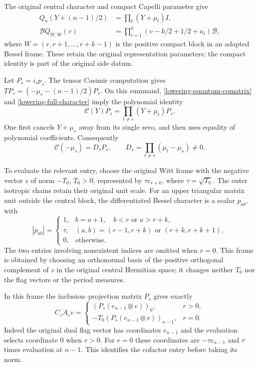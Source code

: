 The original central character and compact Capelli parameter give
\begin{align}
 Q_n(Y+(n-1)/2)&=\prod_t(Y+\mu_t)I,                  \label{lowering-full-character}\\
 \mathcal B Q_{W,W}(v)
   &=\prod_{i=1}^k(v-k/2+1/2+u_i)\mathcal B,        \label{lowering-compact-character}
\end{align}
where $W=(r,r+1,\ldots,r+k-1)$ is the positive compact block in an
adapted Bessel frame.  These retain the original representation
parameters; the compact identity is part of the original side datum.

Let $P_s=i_sp_s$.  The tensor Casimir computation gives
$TP_s=(-\mu_s-(n-1)/2)P_s$.  On this summand,
\eqref{lowering-quantum-comatrix} and
\eqref{lowering-full-character} imply the polynomial identity
\[
              \mathcal C(Y)P_s=\prod_{t\ne s}(Y+\mu_t)P_s.
\]
One first cancels $Y+\mu_s$ away from its single zero, and then uses
equality of polynomial coefficients.  Consequently
\begin{equation}\label{lowering-projector-cofactor}
              \mathcal C(-\mu_s)=D_sP_s,
        \qquad D_s=\prod_{t\ne s}(\mu_t-\mu_s)\ne0.
\end{equation}

To evaluate the relevant entry, choose the original Witt frame with
the negative vector $z$ of norm $-T_0$, $T_0>0$, represented by
$\tau e_{r+k}$, where $\tau=\sqrt{T_0}$.  The outer isotropic
chains retain their original unit scale.  For an upper triangular
matrix unit outside the central block, the differentiated Bessel
character is a scalar $p_{ab}$, with
\[
 |p_{ab}|=
 \begin{cases}
 1,&b=a+1,\quad b<r\text{ or }a>r+k,\\
 \tau,&(a,b)=(r-1,r+k)\text{ or }(r+k,r+k+1),\\
 0,&\text{otherwise}.
 \end{cases}
\]
The two entries involving nonexistent indices are omitted when $r=0$.
This frame is obtained by choosing an orthonormal basis of the positive
orthogonal complement of $z$ in the original central Hermitian space;
it changes neither $T_0$ nor the flag vectors or the period measures.

In this frame the inclusion--projection matrix $P_s$ gives exactly
\[
 C_sA_sv=
 \begin{cases}
       (P_s(e_{n-1}\otimes v))_0,&r>0,\\
       -T_0(P_s(e_{n-1}\otimes v))_{n-1},&r=0.
 \end{cases}
\]
Indeed the original dual flag vector has coordinates $e_{n-1}$
and the evaluation selects coordinate $0$ when $r>0$.  For $r=0$
these coordinates are $-\tau e_{n-1}$ and $\tau$ times evaluation
at $n-1$.  This identifies the cofactor entry before taking its norm.

